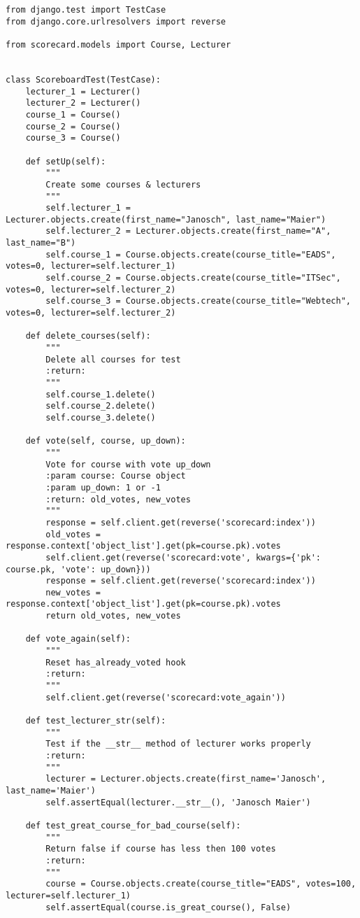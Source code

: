 \begin{lstlisting}[style=Python, caption=scorecard/tests.py, label=lst:tests.py]
from django.test import TestCase
from django.core.urlresolvers import reverse

from scorecard.models import Course, Lecturer


class ScoreboardTest(TestCase):
    lecturer_1 = Lecturer()
    lecturer_2 = Lecturer()
    course_1 = Course()
    course_2 = Course()
    course_3 = Course()

    def setUp(self):
        """
        Create some courses & lecturers
        """
        self.lecturer_1 = Lecturer.objects.create(first_name="Janosch", last_name="Maier")
        self.lecturer_2 = Lecturer.objects.create(first_name="A", last_name="B")
        self.course_1 = Course.objects.create(course_title="EADS", votes=0, lecturer=self.lecturer_1)
        self.course_2 = Course.objects.create(course_title="ITSec", votes=0, lecturer=self.lecturer_2)
        self.course_3 = Course.objects.create(course_title="Webtech", votes=0, lecturer=self.lecturer_2)

    def delete_courses(self):
        """
        Delete all courses for test
        :return:
        """
        self.course_1.delete()
        self.course_2.delete()
        self.course_3.delete()

    def vote(self, course, up_down):
        """
        Vote for course with vote up_down
        :param course: Course object
        :param up_down: 1 or -1
        :return: old_votes, new_votes
        """
        response = self.client.get(reverse('scorecard:index'))
        old_votes = response.context['object_list'].get(pk=course.pk).votes
        self.client.get(reverse('scorecard:vote', kwargs={'pk': course.pk, 'vote': up_down}))
        response = self.client.get(reverse('scorecard:index'))
        new_votes = response.context['object_list'].get(pk=course.pk).votes
        return old_votes, new_votes

    def vote_again(self):
        """
        Reset has_already_voted hook
        :return:
        """
        self.client.get(reverse('scorecard:vote_again'))

    def test_lecturer_str(self):
        """
        Test if the __str__ method of lecturer works properly
        :return:
        """
        lecturer = Lecturer.objects.create(first_name='Janosch', last_name='Maier')
        self.assertEqual(lecturer.__str__(), 'Janosch Maier')

    def test_great_course_for_bad_course(self):
        """
        Return false if course has less then 100 votes
        :return:
        """
        course = Course.objects.create(course_title="EADS", votes=100, lecturer=self.lecturer_1)
        self.assertEqual(course.is_great_course(), False)


\end{lstlisting}
